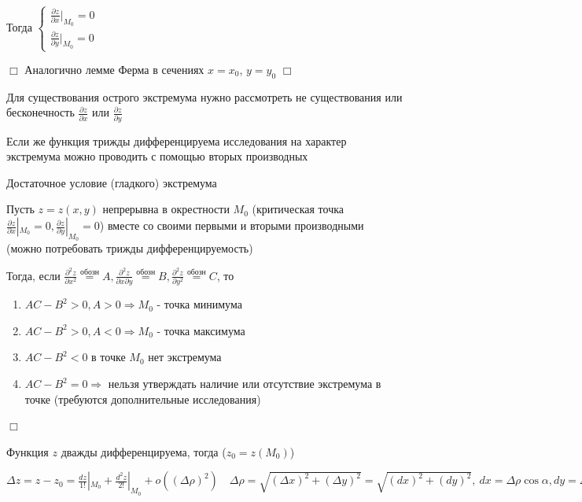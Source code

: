 \documentclass[12pt]{article}
\begin{document}
    Тогда $\begin{cases}\frac{\partial z}{\partial x} |_{M_0} = 0 \\ \frac{\partial z}{\partial y} |_{M_0} = 0\end{cases}$

    $\Box$ Аналогично лемме Ферма в сечениях $x = x_0$, $y = y_0$ $\Box$

    Для существования острого экстремума нужно рассмотреть не существования или бесконечность $\frac{\partial z}{\partial x}$ или $\frac{\partial z}{\partial y}$

    Если же функция трижды дифференцируема исследования на характер экстремума можно проводить с помощью вторых производных

    \hypertarget{extremumsufficientcondition}{}

    \Th Достаточное условие (гладкого) экстремума

    Пусть $z = z(x, y)$ непрерывна в окрестности $M_0$ (критическая точка $\frac{\partial z}{\partial x} |_{M_0} = 0, \frac{\partial z}{\partial y} |_{M_0} = 0$)
    вместе со своими первыми и вторыми производными (можно потребовать трижды дифференцируемость)

    Тогда, если $\frac{\partial^2 z}{\partial x^2} \stackrel{\text{обозн}}{=} A, \frac{\partial^2 z}{\partial x \partial y} \stackrel{\text{обозн}}{=} B, \frac{\partial^2 z}{\partial y^2} \stackrel{\text{обозн}}{=} C$, то

    \begin{enumerate}
        \item $AC - B^2 > 0, A > 0 \Longrightarrow M_0$ - точка минимума
        \item $AC - B^2 > 0, A < 0 \Longrightarrow M_0$ - точка максимума
        \item $AC - B^2 < 0$ в точке $M_0$ нет экстремума
        \item $AC - B^2 = 0\Longrightarrow$ нельзя утверждать наличие или отсутствие экстремума в точке (требуются дополнительные исследования)
    \end{enumerate}

    $\Box$

    Функция $z$ дважды дифференцируема, тогда ($z_0 = z(M_0)$)

    $\Delta z = z - z_0 = \frac{dz}{1!} |_{M_0} + \frac{d^2 z}{2!} |_{M_0} + o((\Delta \rho)^2) \quad \Delta \rho = \sqrt{(\Delta x)^2 + (\Delta y)^2} = \sqrt{(dx)^2 + (dy)^2}, \ dx = \Delta\rho \cos\alpha, dy = \Delta\rho \sin\alpha$
\end{document}
